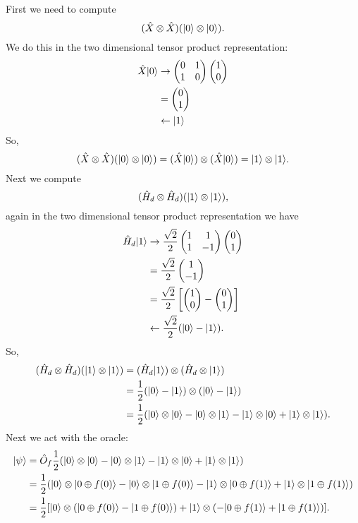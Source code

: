     First we need to compute
    \[(\hat{X}\otimes\hat{X})(\vert {0} \rangle\otimes\vert {0} \rangle).\]
    We do this in the two dimensional tensor product representation:
    \begin{align*}
        \hat{X}\vert {0} \rangle &\mathrel{\rightarrow} \begin{pmatrix} {0} & {1}\\ {1} & {0} \end{pmatrix}\begin{pmatrix} {1} \\ {0} \end{pmatrix}\\
        &= \begin{pmatrix} {0} \\ {1} \end{pmatrix}\\
        &\mathrel{\leftarrow} \vert {1} \rangle
    \end{align*}
    So,
    \[(\hat{X}\otimes\hat{X})(\vert {0} \rangle\otimes\vert {0} \rangle) = (\hat{X}\vert {0} \rangle)\otimes(\hat{X}\vert {0} \rangle) = \vert {1} \rangle\otimes\vert {1} \rangle.\]
    Next we compute
    \[(\hat{H}_d\otimes\hat{H}_d)(\vert {1} \rangle\otimes\vert {1} \rangle),\]
    again in the two dimensional tensor product representation we have
    \begin{align*}
        \hat{H}_d\vert {1} \rangle &\mathrel{\rightarrow} \frac{\sqrt{2}}{2}\begin{pmatrix} {1} & {1}\\ {1} & {-1} \end{pmatrix}\begin{pmatrix} {0} \\ {1} \end{pmatrix}\\
        &= \frac{\sqrt{2}}{2}\begin{pmatrix} {1} \\ {-1} \end{pmatrix}\\
        &= \frac{\sqrt{2}}{2}\left[\begin{pmatrix} {1} \\ {0} \end{pmatrix} - \begin{pmatrix} {0} \\ {1} \end{pmatrix}\right]\\
        &\mathrel{\leftarrow} \frac{\sqrt{2}}{2}(\vert {0} \rangle - \vert {1} \rangle).
    \end{align*}
    So,
    \begin{align*}
        (\hat{H}_d\otimes\hat{H}_d) (\vert {1} \rangle\otimes\vert {1} \rangle) &= (\hat{H}_d\vert {1} \rangle)\otimes (\hat{H}_d\otimes\vert {1} \rangle)\\
        &= \frac{1}{2}(\vert {0} \rangle - \vert {1} \rangle)\otimes(\vert {0} \rangle - \vert {1} \rangle)\\
        &= \frac{1}{2}(\vert {0} \rangle\otimes\vert {0} \rangle - \vert {0} \rangle\otimes\vert {1} \rangle - \vert {1} \rangle\otimes\vert {0} \rangle + \vert {1} \rangle\otimes\vert {1} \rangle).
    \end{align*}
    Next we act with the oracle:
    \begin{align*}
        \vert {\psi} \rangle &= \hat{O}_f \frac{1}{2}(\vert {0} \rangle\otimes\vert {0} \rangle - \vert {0} \rangle\otimes\vert {1} \rangle - \vert {1} \rangle\otimes\vert {0} \rangle + \vert {1} \rangle\otimes\vert {1} \rangle)\\
        &= \frac{1}{2}(\vert {0} \rangle\otimes\vert {0\oplus f(0)} \rangle - \vert {0} \rangle\otimes\vert {1\oplus f(0)} \rangle - \vert {1} \rangle\otimes\vert {0\oplus f(1)} \rangle + \vert {1} \rangle\otimes\vert {1\oplus f(1)} \rangle)\\
        &= \frac{1}{2}[\vert {0} \rangle\otimes(\vert {0\oplus f(0)} \rangle - \vert {1\oplus f(0)} \rangle) + \vert {1} \rangle\otimes (-\vert {0\oplus f(1)} \rangle + \vert {1\oplus f(1)} \rangle)].
    \end{align*}
